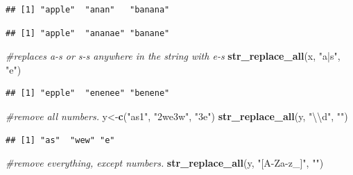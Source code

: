 \documentclass[]{book}
\newenvironment{Shaded}{\begin{snugshade}}{\end{snugshade}}
\newcommand{\KeywordTok}[1]{\textcolor[rgb]{0.13,0.29,0.53}{\textbf{#1}}}
\newcommand{\CharTok}[1]{\textcolor[rgb]{0.31,0.60,0.02}{#1}}
\newcommand{\StringTok}[1]{\textcolor[rgb]{0.31,0.60,0.02}{#1}}
\newcommand{\CommentTok}[1]{\textcolor[rgb]{0.56,0.35,0.01}{\textit{#1}}}
\newcommand{\NormalTok}[1]{#1}
\begin{document}
\begin{verbatim}
## [1] "apple"  "anan"   "banana"
\end{verbatim}

\begin{Shaded}
\end{Shaded}

\begin{verbatim}
## [1] "apple"  "ananae" "banane"
\end{verbatim}

\begin{Shaded}
\begin{Highlighting}[]
\CommentTok{#replaces a-s or s-s anywhere in the string with e-s}
\KeywordTok{str_replace_all}\NormalTok{(x, }\StringTok{"a|s"}\NormalTok{, }\StringTok{"e"}\NormalTok{)}
\end{Highlighting}
\end{Shaded}

\begin{verbatim}
## [1] "epple"  "enenee" "benene"
\end{verbatim}

\begin{Shaded}
\begin{Highlighting}[]
\CommentTok{#remove all numbers. }
\NormalTok{y<-}\KeywordTok{c}\NormalTok{(}\StringTok{"as1"}\NormalTok{, }\StringTok{"2we3w"}\NormalTok{, }\StringTok{"3e"}\NormalTok{)}
\KeywordTok{str_replace_all}\NormalTok{(y, }\StringTok{"}\CharTok{\textbackslash{}\textbackslash{}}\StringTok{d"}\NormalTok{, }\StringTok{""}\NormalTok{) }
\end{Highlighting}
\end{Shaded}

\begin{verbatim}
## [1] "as"  "wew" "e"
\end{verbatim}

\begin{Shaded}
\begin{Highlighting}[]
\CommentTok{#remove everything, except numbers. }
\KeywordTok{str_replace_all}\NormalTok{(y, }\StringTok{"[A-Za-z_]"}\NormalTok{, }\StringTok{""}\NormalTok{) }
\end{Highlighting}
\end{Shaded}
\end{document}
